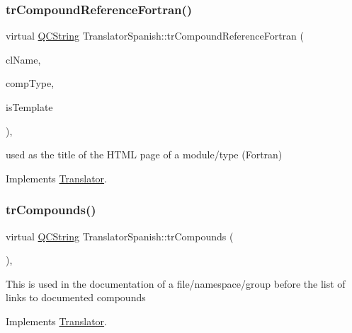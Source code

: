 \subsubsection{\texorpdfstring{trCompoundReferenceFortran()}{trCompoundReferenceFortran()}}
{\footnotesize\ttfamily virtual \mbox{\hyperlink{class_q_c_string}{Q\+C\+String}} Translator\+Spanish\+::tr\+Compound\+Reference\+Fortran (\begin{DoxyParamCaption}\item[{const char $\ast$}]{cl\+Name,  }\item[{\mbox{\hyperlink{class_class_def_ae70cf86d35fe954a94c566fbcfc87939}{Class\+Def\+::\+Compound\+Type}}}]{comp\+Type,  }\item[{bool}]{is\+Template }\end{DoxyParamCaption})\hspace{0.3cm}{\ttfamily [inline]}, {\ttfamily [virtual]}}

used as the title of the H\+T\+ML page of a module/type (Fortran) 

Implements \mbox{\hyperlink{class_translator}{Translator}}.

\mbox{\label{class_translator_spanish_a4436803b1ed2779fe8e9ee3c08fc7478}} 
\subsubsection{\texorpdfstring{trCompounds()}{trCompounds()}}
{\footnotesize\ttfamily virtual \mbox{\hyperlink{class_q_c_string}{Q\+C\+String}} Translator\+Spanish\+::tr\+Compounds (\begin{DoxyParamCaption}{ }\end{DoxyParamCaption})\hspace{0.3cm}{\ttfamily [inline]}, {\ttfamily [virtual]}}

This is used in the documentation of a file/namespace/group before the list of links to documented compounds 

Implements \mbox{\hyperlink{class_translator}{Translator}}.

\mbox{\label{class_translator_spanish_a433eaf197d8eaacacf1259df0359e4c8}} 
